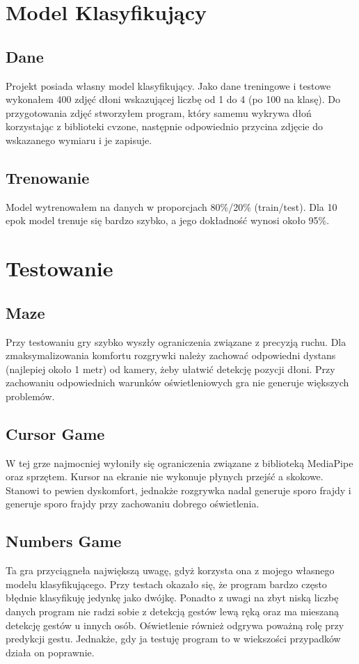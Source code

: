 \documentclass{article}
\begin{document}
\section{Model Klasyfikujący}
\subsection{Dane}
Projekt posiada własny model klasyfikujący. Jako dane treningowe i testowe wykonałem 400 zdjęć dłoni wskazującej liczbę od 1 do 4 (po 100 na klasę). Do przygotowania zdjęć stworzyłem program, który samemu wykrywa dłoń korzystając z biblioteki cvzone, następnie odpowiednio przycina zdjęcie do wskazanego wymiaru i je zapisuje.

\subsection{Trenowanie}
Model wytrenowałem na danych w proporcjach 80\%/20\% (train/test). Dla 10 epok model trenuje się bardzo szybko, a jego dokładność wynosi około 95\%.

\section{Testowanie}
\subsection{Maze}
Przy testowaniu gry szybko wyszły ograniczenia związane z precyzją ruchu. Dla zmaksymalizowania komfortu rozgrywki należy zachować odpowiedni dystans (najlepiej około 1 metr) od kamery, żeby ułatwić detekcję pozycji dłoni. Przy zachowaniu odpowiednich warunków oświetleniowych gra nie generuje większych problemów.

\subsection{Cursor Game}
W tej grze najmocniej wyłoniły się ograniczenia związane z biblioteką MediaPipe oraz sprzętem. Kursor na ekranie nie wykonuje płynych przejść a skokowe. Stanowi to pewien dyskomfort, jednakże rozgrywka nadal generuje sporo frajdy i generuje sporo frajdy przy zachowaniu dobrego oświetlenia.

\newpage

\subsection{Numbers Game}
Ta gra przyciągneła największą uwagę, gdyż korzysta ona z mojego własnego modelu klasyfikującego. Przy testach okazało się, że program bardzo często błędnie klasyfikuję jedynkę jako dwójkę. Ponadto z uwagi na zbyt niską liczbę danych program nie radzi sobie z detekcją gestów lewą ręką oraz ma mieszaną detekcję gestów u innych osób. Oświetlenie również odgrywa poważną rolę przy predykcji gestu. Jednakże, gdy ja testuję program to w wiekszości przypadków działa on poprawnie.
\end{document}
